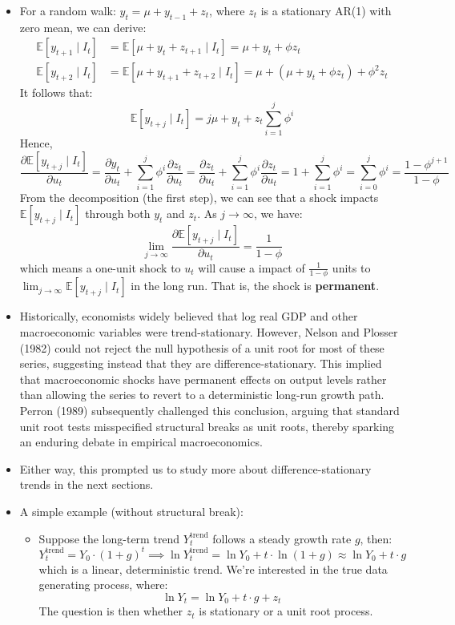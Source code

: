 \documentclass[notitlepage]{article}
\begin{document}
\begin{itemize}
    \item For a random walk: \(y_t = \mu + y_{t-1} + z_t\), where \(z_t\) is a stationary AR(1) with zero mean, we can derive:
    \begin{align*}
        \mathbb{E}[y_{t+1} \mid I_t] &= \mathbb{E}[\mu + y_{t} + z_{t+1} \mid I_t] = \mu + y_{t} + \phi z_t \\
        \mathbb{E}[y_{t+2} \mid I_t] &= \mathbb{E}[\mu + y_{t+1} + z_{t+2} \mid I_t] = \mu + (\mu + y_{t} + \phi z_t) + \phi^2 z_t
    \end{align*}
    It follows that:
    \[
    \mathbb{E}[y_{t+j} \mid I_t] = j\mu + y_t + z_t \sum_{i=1}^j \phi^i
    \]
    Hence,
    \[
    \frac{\partial \mathbb{E}[y_{t+j}\mid I_t]}{\partial u_t} = \frac{\partial y_t}{\partial u_t} + \sum_{i=1}^j \phi^i \frac{\partial z_t}{\partial u_t} = \frac{\partial z_t}{\partial u_t} + \sum_{i=1}^j \phi^i \frac{\partial z_t}{\partial u_t} = 1 + \sum_{i=1}^j \phi^i = \sum_{i=0}^j \phi^i = \frac{1-\phi^{j+1}}{1-\phi}
    \]
    From the decomposition (the first step), we can see that a shock impacts \(\mathbb{E}[y_{t+j}\mid I_t]\) through both \(y_t\) and \(z_t\). As \(j \to \infty\), we have:
    \[
    \lim_{j\to\infty} \frac{\partial \mathbb{E}[y_{t+j}\mid I_t]}{\partial u_t} = \frac{1}{1-\phi}
    \]
    which means a one-unit shock to \(u_t\) will cause a impact of \(\frac{1}{1-\phi}\) units to \(\lim_{j\to\infty} \mathbb{E}[y_{t+j} \mid I_t]\) in the long run. That is, the shock is \textbf{permanent}.

    \item Historically, economists widely believed that log real GDP and other macroeconomic variables were trend-stationary. However, Nelson and Plosser (1982) could not reject the null hypothesis of a unit root for most of these series, suggesting instead that they are difference-stationary. This implied that macroeconomic shocks have permanent effects on output levels rather than allowing the series to revert to a deterministic long-run growth path. Perron (1989) subsequently challenged this conclusion, arguing that standard unit root tests misspecified structural breaks as unit roots, thereby sparking an enduring debate in empirical macroeconomics.

    \item Either way, this prompted us to study more about difference-stationary trends in the next sections.

    \item A simple example (without structural break):
    \begin{itemize}
        \item Suppose the long-term trend \(Y_t^\text{trend}\) follows a steady growth rate \(g\), then:
        \[
        Y_t^\text{trend}  = Y_0 \cdot (1+g)^t \implies \ln Y_t^\text{trend}  = \ln Y_0 + t \cdot \ln(1+g) \approx \ln Y_0 + t \cdot g
        \]
        which is a linear, deterministic trend. We're interested in the true data generating process, where:
        \[
        \ln Y_t = \ln Y_0 + t \cdot g + z_t
        \]
        The question is then whether \(z_t\) is stationary or a unit root process.
    \end{itemize}
\end{itemize}
\end{document}

